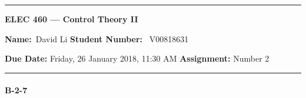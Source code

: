 \begin{center}
	\hrule
	\vspace{.4cm}
	{\textbf { \large ELEC 460 --- Control Theory II}}
\end{center}
{\textbf{Name:}\ David Li \hspace{\fill} \textbf{Student Number:}} \ V00818631  \\
{\textbf{Due Date:} Friday, 26 January 2018, 11:30 AM \hspace{\fill} \textbf{Assignment:} Number 2 \\
	\hrule
	
\paragraph{B-2-7}

%	


}
